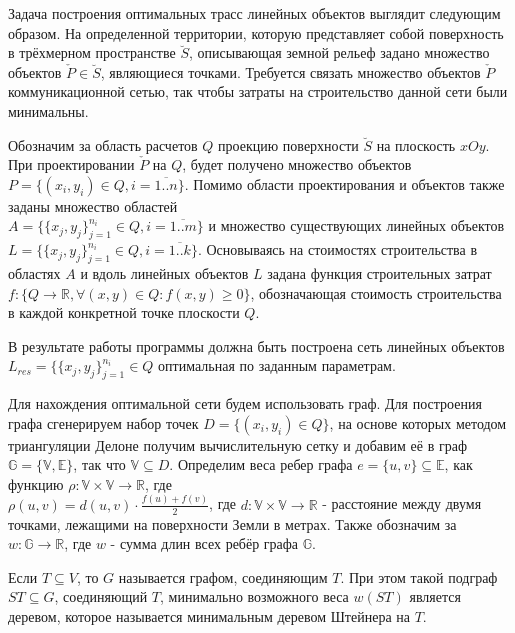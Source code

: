 

Задача построения оптимальных трасс линейных объектов выглядит следующим образом. На определенной территории, которую представляет собой поверхность в трёхмерном пространстве $\breve{S}$, описывающая земной рельеф задано множество объектов $\check{P} \in \breve{S}$, являющиеся точками. Требуется связать множество объектов $\check{P}$ коммуникационной сетью, так чтобы затраты на строительство данной сети были минимальны.
\par
Обозначим за область расчетов $Q$ проекцию поверхности $\breve{S}$ на плоскость $xOy$. 
При проектировании  $\check{P}$ на $Q$, будет получено множество объектов \mbox{$P = \{(x_i, y_i) \in Q , i=\overline{1..n}\}$}. Помимо области проектирования и объектов также заданы множество областей \\ \mbox{$A = \{\{x_{j},y_{j}\}_{j=1}^{n_i} \in Q, i=\overline{1..m}\}$} и множество существующих линейных объектов \\ \mbox{$L = \{\{x_{j},y_{j}\}_{j=1}^{n_i} \in Q, i=\overline{1..k}\}$}. 
Основываясь на стоимостях строительства в областях $A$ и вдоль линейных объектов $L$ задана функция строительных затрат \\ \mbox{$f: \{Q \rightarrow \mathbb{R}, \forall(x, y) \in Q: f(x, y) \ge 0\}$}, обозначающая стоимость строительства в каждой конкретной точке плоскости $Q$.
\par
В результате работы программы должна быть построена сеть линейных объектов \\
$L_{res} = \{\{x_{j},y_{j}\}_{j=1}^{n_i} \in Q$ оптимальная по заданным параметрам.
\par
Для нахождения оптимальной сети будем использовать граф. 
Для построения графа сгенерируем набор точек $D  = \{(x_i, y_i) \in Q\}$, на основе которых методом триангуляции Делоне получим вычислительную сетку и добавим её в граф $\mathbb{G} = \{\mathbb{V}, \mathbb{E}\}$, так что $\mathbb{V} \subseteq D$. Определим веса ребер графа $e = \{u,v\} \subseteq \mathbb{E}$, как функцию $\rho: \mathbb{V} \times \mathbb{V} \rightarrow \mathbb{R}$, где \\ $\rho(u, v) = d(u, v) \cdot \frac{f(u) + f(v)}{2} $, где $d:  \mathbb{V} \times \mathbb{V} \rightarrow \mathbb{R}$ - расстояние между двумя точками, лежащими на поверхности Земли в  метрах. Также обозначим за $w: \mathbb{G} \rightarrow \mathbb{R}$, где $w$ - сумма длин всех ребёр графа $\mathbb{G}$.

Если $T \subseteq V$, то $G$ называется графом, соединяющим $T$. При этом такой подграф $ST \subseteq G$, соединяющий $T$, минимально возможного веса $w(ST)$ является деревом, которое называется минимальным деревом Штейнера на $T$.

